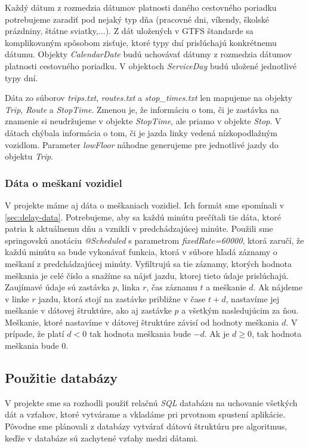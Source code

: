 Každý dátum z rozmedzia dátumov platnosti daného cestovného poriadku potrebujeme zaradiť pod nejaký typ dňa (pracovné dni, víkendy, školské prázdniny, štátne sviatky,...). Z dát uložených v  GTFS štandarde sa komplikovaným spôsobom zisťuje, ktoré typy dní prislúchajú konkrétnemu dátumu. Objekty \textit{CalendarDate} budú uchovávať dátumy z rozmedzia dátumov platnosti cestovného poriadku. V objektoch \textit{ServiceDay} budú uložené jednotlivé typy dní. 

Dáta zo súborov \textit{trips.txt}, \textit{routes.txt} a \textit{stop\_times.txt} len mapujeme na objekty \textit{Trip}, \textit{Route} a \textit{StopTime}. Zmenou je, že informáciu o tom, či je zastávka na znamenie si neudržujeme v objekte \textit{StopTime}, ale priamo v objekte \textit{Stop}. V dátach chýbala informácia o tom, či je jazda linky vedená nízkopodlažným vozidlom. Parameter \textit{lowFloor} náhodne generujeme pre jednotlivé jazdy do objektu \textit{Trip}.

\subsubsection{Dáta o meškaní vozidiel}
V projekte máme aj dáta o meškaniach vozidiel. Ich formát sme spomínali v \ref{sec:delay-data}. Potrebujeme, aby sa každú minútu prečítali tie dáta, ktoré patria k aktuálnemu dňu a vznikli v predchádzajúcej minúte. Použili sme springovskú anotáciu \textit{@Scheduled} s parametrom \textit{fixedRate=60000}, ktorá zaručí, že každú minútu sa bude vykonávať funkcia, ktorá v súbore hľadá záznamy o meškaní z predchádzajúcej minúty. Vyfiltrujú sa tie záznamy, ktorých hodnota meškania je celé číslo a snažíme sa nájsť jazdu, ktorej tieto údaje prislúchajú. Zaujímavé údaje sú zastávka $p$, linka $r$, čas záznamu $t$ a meškanie $d$. Ak nájdeme v linke $r$ jazdu, ktorá stojí na zastávke približne v čase $t+d$, nastavíme jej meškanie v dátovej štruktúre, ako aj zastávke $p$ a všetkým  nasledujúcim za ňou. Meškanie, ktoré nastavíme v dátovej štruktúre závisí od hodnoty meškania $d$. V prípade, že platí $d < 0$ tak hodnota meškania bude $-d$. Ak je $d \geq 0$, tak hodnota meškania bude 0. 

\subsection{Použitie databázy}
V projekte sme sa rozhodli použiť relačnú \textit{SQL} databázu na uchovanie všetkých dát a vzťahov, ktoré vytvárame a vkladáme pri prvotnom spustení aplikácie. Pôvodne sme plánovali z databázy vytvárať dátovú štruktúru pre algoritmus, keďže v databáze sú zachytené vzťahy medzi dátami.

